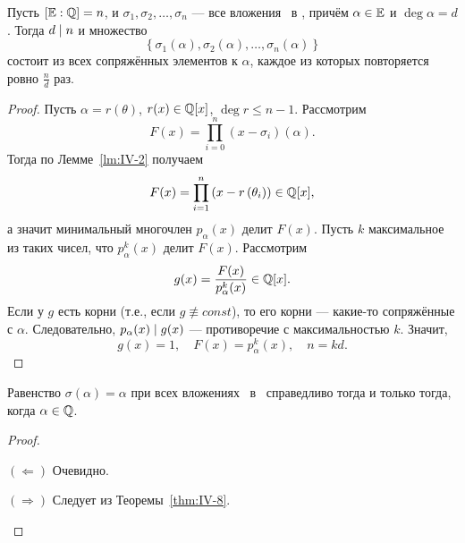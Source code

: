 \begin{ntheorem}
\label{thm:IV-8}
    Пусть $[\mathbb{E} : \mathbb{Q}] = n$, и $\sigma_1, \sigma_2, \dots, \sigma_n$ --- все вложения \EE~в \CC, причём $\alpha \in \mathbb{E}$ и $\deg{\alpha} = d$. Тогда $d \mid n$ и множество
    \[
        \left\{ \sigma_1(\alpha), \sigma_2(\alpha), \dots, \sigma_n(\alpha) \right\}
    \]
    состоит из всех сопряжённых элементов к $\alpha$, каждое из которых повторяется ровно $\frac{n}{d}$ раз.
\end{ntheorem}
\begin{proof}
    Пусть $\alpha = r(\theta)$, $r(x) \in \mathbb{Q}[x]$, $\deg{r} \le n-1$. Рассмотрим 
    \[
        F(x) = \prod_{i=0}^n \left( x-\sigma_i \right)(\alpha).
    \]
    Тогда по Лемме~\ref{lm:IV-2} получаем
    \[
        F(x) = \prod_{i=1}^n \left( x - r\left(\theta_i\right)\right) \in \mathbb{Q}[x],
    \]
    а значит минимальный многочлен $p_{\alpha}(x)$ делит $F(x)$. 
    Пусть $k$ максимальное из таких чисел, что $p_{\alpha}^k(x)$ делит $F(x)$. Рассмотрим
    \[
        g(x) = \frac{F(x)}{p_{\alpha}^k(x)} \in \mathbb{Q}[x].
    \]
    Если у $g$ есть корни (т.е., если $g \not\equiv const$), то его корни --- какие-то сопряжённые с $\alpha$. Следовательно, $p_\alpha(x) \mid g(x)$ --- противоречие с максимальностью $k$. Значит,
    \[
        g(x) = 1, \quad F(x)=p_{\alpha}^k(x), \quad n = kd.
    \]
\end{proof}

\begin{corollary}
    Равенство $\sigma(\alpha) = \alpha$ при всех вложениях \EE~в \CC~справедливо тогда и только тогда, когда $\alpha \in \mathbb{Q}$.
\end{corollary}
\begin{proof}
\hfill
    \begin{statesp}
        \item[$(\Leftarrow)$] Очевидно.
        \item[$(\Rightarrow)$] Следует из Теоремы~\ref{thm:IV-8}.
    \end{statesp}
\end{proof}
